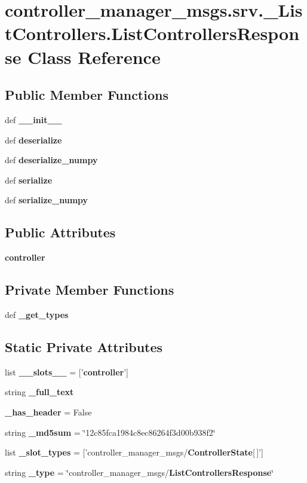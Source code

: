 \section{controller\-\_\-manager\-\_\-msgs.\-srv.\-\_\-\-List\-Controllers.\-List\-Controllers\-Response \-Class \-Reference}
\label{classcontroller__manager__msgs_1_1srv_1_1__ListControllers_1_1ListControllersResponse}
\subsection*{\-Public \-Member \-Functions}
\begin{DoxyCompactItemize}
\item 
def {\bf \-\_\-\-\_\-init\-\_\-\-\_\-}
\item 
def {\bf deserialize}
\item 
def {\bf deserialize\-\_\-numpy}
\item 
def {\bf serialize}
\item 
def {\bf serialize\-\_\-numpy}
\end{DoxyCompactItemize}
\subsection*{\-Public \-Attributes}
\begin{DoxyCompactItemize}
\item 
{\bf controller}
\end{DoxyCompactItemize}
\subsection*{\-Private \-Member \-Functions}
\begin{DoxyCompactItemize}
\item 
def {\bf \-\_\-get\-\_\-types}
\end{DoxyCompactItemize}
\subsection*{\-Static \-Private \-Attributes}
\begin{DoxyCompactItemize}
\item 
list {\bf \-\_\-\-\_\-slots\-\_\-\-\_\-} = ['{\bf controller}']
\item 
string {\bf \-\_\-full\-\_\-text}
\item 
{\bf \-\_\-has\-\_\-header} = \-False
\item 
string {\bf \-\_\-md5sum} = \char`\"{}12c85fca1984c8ec86264f3d00b938f2\char`\"{}
\item 
list {\bf \-\_\-slot\-\_\-types} = ['controller\-\_\-manager\-\_\-msgs/{\bf \-Controller\-State}[$\,$]']
\item 
string {\bf \-\_\-type} = \char`\"{}controller\-\_\-manager\-\_\-msgs/{\bf \-List\-Controllers\-Response}\char`\"{}
\end{DoxyCompactItemize}


